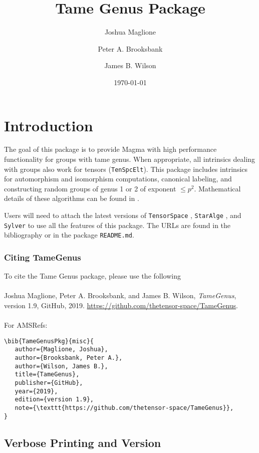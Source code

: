 \documentclass{documentation}
\title{Tame Genus Package}
\author{Joshua Maglione}
\author{Peter A. Brooksbank}
\author{James B. Wilson}
\date{\today}
\begin{document}
\frontmatter

\maketitle
\tableofcontents

\mainmatter

\chapter{Introduction}

The goal of this package is to provide {\sc Magma} \cite{Magma} with high performance functionality for groups with tame genus. 
When appropriate, all intrinsics dealing with groups also work for tensors ({\tt TenSpcElt}). 
This package includes intrinsics for automorphism and isomorphism computations, canonical labeling, and constructing random groups of genus 1 or 2 of exponent  $\leq p^2$. 
Mathematical details of these algorithms can be found in \cite{BMW}.

Users will need to attach the latest versions of \texttt{TensorSpace} \cite{TensorSpacePackage}, \texttt{StarAlge} \cite{StarAlge}, and \texttt{Sylver} \cite{Sylver} to use all the features of this package. 
The URLs are found in the bibliography or in the package \texttt{README.md}.

\subsection*{Citing TameGenus} 
To cite the Tame Genus package, please use the following\\
\\
Joshua Maglione, Peter A. Brooksbank, and James B. Wilson, \emph{TameGenus}, version 1.9, GitHub, 2019. \url{https://github.com/thetensor-space/TameGenus}. \\
\\
For AMSRefs:
\begin{verbatim}
\bib{TameGenusPkg}{misc}{
   author={Maglione, Joshua},
   author={Brooksbank, Peter A.},
   author={Wilson, James B.},
   title={TameGenus},
   publisher={GitHub},
   year={2019},
   edition={version 1.9},
   note={\texttt{https://github.com/thetensor-space/TameGenus}},
}
\end{verbatim}


\section{Verbose Printing and Version}
\end{document}

